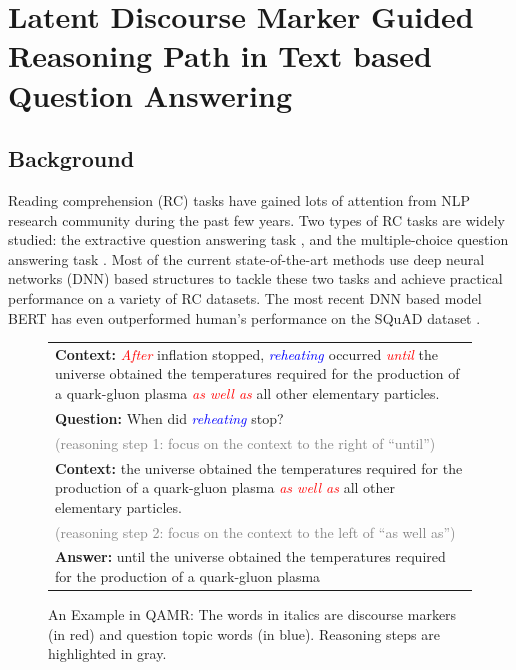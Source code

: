 
\section{Latent Discourse Marker Guided Reasoning Path in Text based Question Answering} \label{sec:3-2}

\subsection{Background}
Reading comprehension (RC) tasks have gained lots of attention from NLP research community during the past few years.  Two types of RC tasks are widely studied: the extractive question answering task \cite{DBLP:conf/emnlp/RajpurkarZLL16,DBLP:conf/acl/RajpurkarJL18}, and the  multiple-choice question answering task \cite{DBLP:conf/aaai/AydinYLLGD14,DBLP:conf/aaai/KhashabiKSR18}. Most of the current state-of-the-art methods use deep neural networks (DNN) based structures to tackle these two tasks and achieve practical performance on a variety of RC datasets. The most recent DNN based model BERT \cite{DBLP:journals/corr/abs-1810-04805} has even outperformed human's performance on the SQuAD dataset \cite{DBLP:conf/emnlp/RajpurkarZLL16}. 
\begin{figure}[ht]
\centering
	{\fontsize{9}{10}\selectfont
    \setlength{\tabcolsep}{0.6mm}
    \begin{tabular}{|p{75mm}|}
    \hline
\textbf{Context: }\textit{\textcolor{red}{After}} inflation stopped, \textit{\textcolor{blue}{reheating }}occurred \textit{\textcolor{red}{until}} the universe obtained the temperatures required for the production of a quark-gluon plasma \textit{\textcolor{red}{as well as}} all other elementary particles. \\
\textbf{Question: }When did \textit{\textcolor{blue}{reheating}} stop?     \\
\textcolor{gray}{(reasoning step 1: focus on the context to the right of ``until'')}\\
\textbf{Context: }the universe obtained the temperatures required for the production of a quark-gluon plasma \textit{\textcolor{red}{as well as}} all other elementary particles. \\
\textcolor{gray}{(reasoning step 2: focus on the context to the left of ``as well as'')}\\
\textbf{Answer: }until the universe obtained the temperatures required for the production of a quark-gluon plasma \\
\hline
    \end{tabular}
    }
\caption{An Example in QAMR: The words in italics are discourse markers (in red) and question topic words (in blue). Reasoning steps are highlighted in gray. }
\label{fig:qa_example}
\end{figure}

